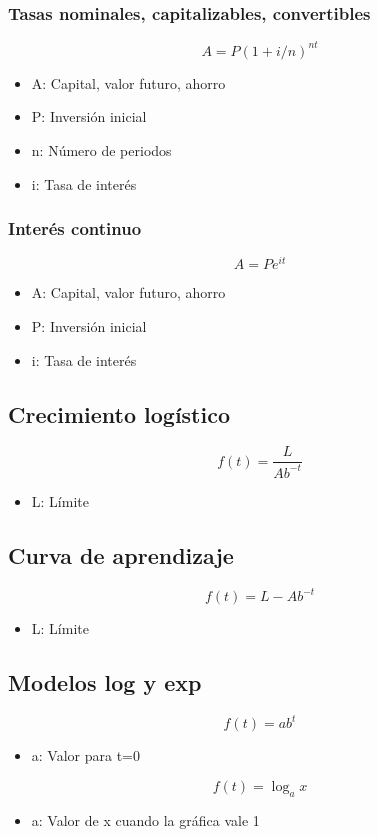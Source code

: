 \subsubsection{Tasas nominales, capitalizables, convertibles}
$$A=P(1+i/n)^{nt}$$
\begin{itemize}
	\item A: Capital, valor futuro, ahorro
	\item P: Inversión inicial
	\item n: Número de periodos
	\item i: Tasa de interés
\end{itemize}

\subsubsection{Interés continuo}
$$A=Pe^{it}$$
\begin{itemize}
	\item A: Capital, valor futuro, ahorro
	\item P: Inversión inicial
	\item i: Tasa de interés
\end{itemize}

\subsection{Crecimiento logístico}
$$f(t)=\dfrac{L}{Ab^{-t}}$$
\begin{itemize}
	\item L: Límite
\end{itemize}

\subsection{Curva de aprendizaje}
$$f(t)=L-Ab^{-t}$$
\begin{itemize}
	\item L: Límite
\end{itemize}

\subsection{Modelos log y exp}
$$f(t)=ab^{t}$$
\begin{itemize}
	\item a: Valor para t=0
\end{itemize}

$$f(t)=\log_ax$$
\begin{itemize}
	\item a: Valor de x cuando la gráfica vale 1
\end{itemize}

